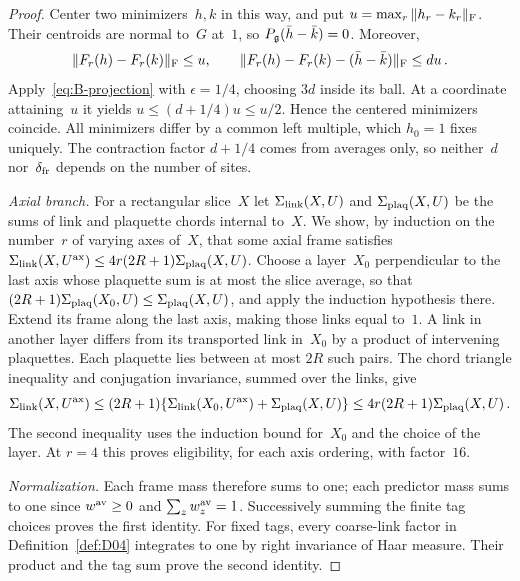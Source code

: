\begin{proof}
Center two minimizers~$h,k$ in this way, and put $u=\max_r\|h_r-k_r\|_{\rm F}$. Their centroids are normal to~$G$ at~$1$, so $P_{\mathfrak{g}}(\bar h-\bar k)=0$. Moreover,
\begin{equation*}
\|F_r(h)-F_r(k)\|_{\rm F}\le u,\qquad
\|F_r(h)-F_r(k)-(\bar h-\bar k)\|_{\rm F}\le du\,.
\end{equation*}
Apply~\eqref{eq:B-projection} with $\epsilon=1/4$, choosing $3d$ inside its ball. At a coordinate attaining~$u$ it yields $u\le(d+1/4)u\le u/2$. Hence the centered minimizers coincide. All minimizers differ by a common left multiple, which $h_0=1$ fixes uniquely. The contraction factor $d+1/4$ comes from averages only, so neither~$d$ nor~$\delta_{\rm fr}$ depends on the number of sites.

\emph{Axial branch.} For a rectangular slice~$X$ let $\Sigma_{\rm link}(X,U)$ and $\Sigma_{\rm plaq}(X,U)$ be the sums of link and plaquette chords internal to~$X$. We show, by induction on the number~$r$ of varying axes of~$X$, that some axial frame satisfies $\Sigma_{\rm link}(X,U^{\rm ax})\le4r(2R+1)\Sigma_{\rm plaq}(X,U)$. Choose a layer~$X_0$ perpendicular to the last axis whose plaquette sum is at most the slice average, so that $(2R+1)\Sigma_{\rm plaq}(X_0,U)\le\Sigma_{\rm plaq}(X,U)$, and apply the induction hypothesis there. Extend its frame along the last axis, making those links equal to~$1$. A link in another layer differs from its transported link in~$X_0$ by a product of intervening plaquettes. Each plaquette lies between at most $2R$ such pairs. The chord triangle inequality and conjugation invariance, summed over the links, give
\begin{equation*}
\Sigma_{\rm link}(X,U^{\rm ax})\le(2R+1)\{\Sigma_{\rm link}(X_0,U^{\rm ax})+\Sigma_{\rm plaq}(X,U)\}
\le4r(2R+1)\Sigma_{\rm plaq}(X,U)\,.
\end{equation*}
The second inequality uses the induction bound for~$X_0$ and the choice of the layer. At $r=4$ this proves eligibility, for each axis ordering, with factor~$16$.

\emph{Normalization.} Each frame mass therefore sums to one; each predictor mass sums to one since $w^{\rm av}\ge0$ and $\sum_z w_z^{\rm av}=1$. Successively summing the finite tag choices proves the first identity. For fixed tags, every coarse-link factor in Definition~\ref{def:D04} integrates to one by right invariance of Haar measure. Their product and the tag sum prove the second identity.
\end{proof}

